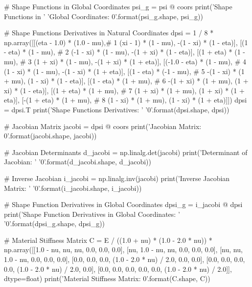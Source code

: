 \begin{python}
    # Shape Functions in Global Coordinates
    psi_g = psi @ coors
    print('Shape Functions in '
          'Global Coordinates: {0}'.format(psi_g.shape, psi_g))

    # Shape Functions Derivatives in Natural Coordinates
    dpsi = 1 / 8 * np.array([[(eta - 1.0) * (1.0 - mu),# 1
                              (xi - 1) * (1 - mu),
                             -(1 - xi) * (1 - eta)],
                             [(1 - eta) * (1 - mu),    # 2
                              (-1 - xi) * (1 - mu),
                             -(1 + xi) * (1 - eta)],
                             [(1 + eta) * (1 - mu),    # 3
                              (1 + xi) * (1 - mu),
                             -(1 + xi) * (1 + eta)],
                             [(-1.0 - eta) * (1 - mu), # 4
                              (1 - xi) * (1 - mu),
                             -(1 - xi) * (1 + eta)],
                             [(1 - eta) * (-1 - mu),   # 5
                             -(1 - xi) * (1 + mu),
                              (1 - xi) * (1 - eta)],
                             [(1 - eta) * (1 + mu),    # 6
                             -(1 + xi) * (1 + mu),
                              (1 + xi) * (1 - eta)],
                             [(1 + eta) * (1 + mu),    # 7
                              (1 + xi) * (1 + mu),
                              (1 + xi) * (1 + eta)],
                             [-(1 + eta) * (1 + mu),   # 8
                              (1 - xi) * (1 + mu),
                              (1 - xi) * (1 + eta)]])
    dpsi = dpsi.T
    print('Shape Functions Derivatives: '
          '{0}'.format(dpsi.shape, dpsi))

    # Jacobian Matrix
    jacobi = dpsi @ coors
    print('Jacobian Matrix: {0}'.format(jacobi.shape, jacobi))

    # Jacobian Determinants
    d_jacobi = np.linalg.det(jacobi)
    print('Determinant of Jacobian: '
          '{0}'.format(d_jacobi.shape, d_jacobi))

    # Inverse Jacobian
    i_jacobi = np.linalg.inv(jacobi)
    print('Inverse Jacobian Matrix: '
          '{0}'.format(i_jacobi.shape, i_jacobi))

    # Shape Function Derivatives in Global Coordinates
    dpsi_g = i_jacobi @ dpsi
    print('Shape Function Derivatives in Global Coordinates: '
          '{0}'.format(dpsi_g.shape, dpsi_g))

    # Material Stiffness Matrix
    C = E / ((1.0 + nu) * (1.0 - 2.0 * nu)) *
        np.array([[1.0 - nu, nu, nu, 0.0, 0.0, 0.0],
                  [nu, 1.0 - nu, nu, 0.0, 0.0, 0.0],
                  [nu, nu, 1.0 - nu, 0.0, 0.0, 0.0],
                  [0.0, 0.0, 0.0, (1.0 - 2.0 * nu) / 2.0, 0.0, 0.0],
                  [0.0, 0.0, 0.0, 0.0, (1.0 - 2.0 * nu) / 2.0, 0.0],
                  [0.0, 0.0, 0.0, 0.0, 0.0, (1.0 - 2.0 * nu) / 2.0]],
                  dtype=float)
    print('Material Stiffness Matrix: {0}'.format(C.shape, C))


\end{python}
